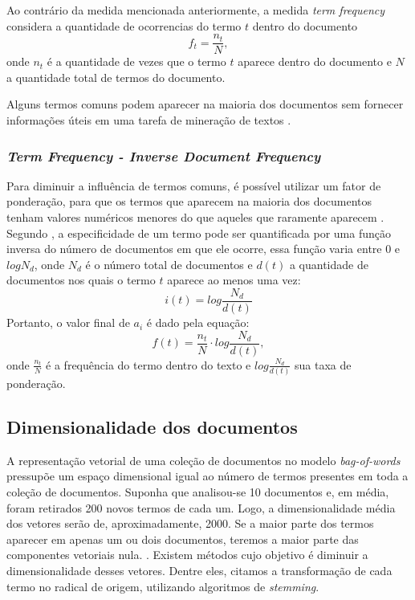 Ao contrário da medida mencionada anteriormente, a medida \textit{term frequency} considera a quantidade de ocorrencias do termo \(t\) dentro do documento
%
\begin{equation}
f_t=\frac{n_t}{N},
\end{equation}
%
onde \(n_t\) é a quantidade de vezes que o termo \(t\) aparece dentro do documento e \(N\) a quantidade total de termos do documento.

Alguns termos comuns podem aparecer na maioria dos documentos sem fornecer informações úteis em uma tarefa de mineração de textos \cite{pretext}.

\subsubsection{\textit{Term Frequency - Inverse Document Frequency}}
\label{ssub:baf-tfidf}

Para diminuir a influência de termos comuns, é possível utilizar um fator de ponderação, para que os termos que aparecem na maioria dos documentos tenham valores numéricos menores do que aqueles que raramente aparecem \cite{pretext}. Segundo , a especificidade de um termo pode ser quantificada por uma função inversa do número de documentos em que ele ocorre, essa função varia entre \(0\) e \(log N_d\), onde \(N_d\) é o número total de documentos e \(d(t)\) a quantidade de documentos nos quais o termo \(t\) aparece ao menos uma vez:
%
\begin{equation}
i(t)=log \frac{N_d}{d(t)}
\end{equation}
%
Portanto, o valor final de \(a_{i}\) é dado pela equação:
%
\begin{equation}
f(t)=\frac{n_t}{N} \cdot log \frac{N_d}{d(t)},
\end{equation}
%
onde \(\frac{n_t}{N}\) é a frequência do termo dentro do texto e \(log \frac{N_d}{d(t)}\) sua taxa de ponderação.

\subsection{Dimensionalidade dos documentos}
\label{sub:dimensionalidade_dos_documentos}

A representação vetorial de uma coleção de documentos no modelo \textit{bag-of-words} pressupõe um espaço dimensional igual ao número de termos presentes em toda a coleção de documentos. Suponha que analisou-se 10 documentos e, em média, foram retirados 200 novos termos de cada um. Logo, a dimensionalidade média dos vetores serão de, aproximadamente, 2000. Se a maior parte dos termos aparecer em apenas um ou dois documentos, teremos a maior parte das componentes vetoriais nula. \cite{pretext}. Existem métodos cujo objetivo é diminuir a dimensionalidade desses vetores. Dentre eles, citamos a transformação de cada termo no radical de origem, utilizando algoritmos de \textit{stemming}.

